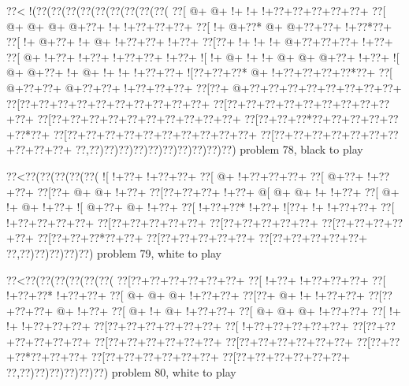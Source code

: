 \vbox{\vbox{\goo
\0??<\- !(\0??(\0??(\0??(\0??(\0??(\0??(\0??(\0??(\0??(
\0??[\- @+\- @+\- !+\- !+\- !+\0??+\0??+\0??+\0??+\0??+
\0??[\- @+\- @+\- @+\- @+\0??+\- !+\- !+\0??+\0??+\0??+
\0??[\- !+\- @+\0??*\- @+\- @+\0??+\0??+\- !+\0??*\0??+
\0??[\- !+\- @+\0??+\- !+\- @+\- !+\0??+\0??+\- !+\0??+
\0??[\0??+\- !+\- !+\- !+\- @+\0??+\0??+\0??+\- !+\0??+
\0??[\- @+\- !+\0??+\- !+\0??+\- !+\0??+\0??+\- !+\0??+
\- ![\- !+\- @+\- !+\- !+\- @+\- @+\- @+\0??+\- !+\0??+
\- ![\- @+\- @+\0??+\- !+\- @+\- !+\- !+\- !+\0??+\0??+
\- ![\0??+\0??+\0??*\- @+\- !+\0??+\0??+\0??+\0??*\0??+
\0??[\- @+\0??+\0??+\- @+\0??+\0??+\- !+\0??+\0??+\0??+
\0??[\0??+\- @+\0??+\0??+\0??+\0??+\0??+\0??+\0??+\0??+
\0??[\0??+\0??+\0??+\0??+\0??+\0??+\0??+\0??+\0??+\0??+
\0??[\0??+\0??+\0??+\0??+\0??+\0??+\0??+\0??+\0??+\0??+
\0??[\0??+\0??+\0??+\0??+\0??+\0??+\0??+\0??+\0??+\0??+
\0??[\0??+\0??+\0??*\0??+\0??+\0??+\0??+\0??+\0??*\0??+
\0??[\0??+\0??+\0??+\0??+\0??+\0??+\0??+\0??+\0??+\0??+
\0??[\0??+\0??+\0??+\0??+\0??+\0??+\0??+\0??+\0??+\0??+
\0??,\0??)\0??)\0??)\0??)\0??)\0??)\0??)\0??)\0??)\0??)
}
\hfil problem 78, black to play\hfil\break
}

\vbox{\vbox{\goo
\0??<\0??(\0??(\0??(\0??(\0??(
\- ![\- !+\0??+\- !+\0??+\0??+
\0??[\- @+\- !+\0??+\0??+\0??+
\0??[\- @+\0??+\- !+\0??+\0??+
\0??[\0??+\- @+\- @+\- !+\0??+
\0??[\0??+\0??+\0??+\- !+\0??+
\- @[\- @+\- @+\- !+\- !+\0??+
\0??[\- @+\- !+\- @+\- !+\0??+
\- ![\- @+\0??+\- @+\- !+\0??+
\0??[\- !+\0??+\0??*\- !+\0??+
\- ![\0??+\- !+\- !+\0??+\0??+
\0??[\- !+\0??+\0??+\0??+\0??+
\0??[\0??+\0??+\0??+\0??+\0??+
\0??[\0??+\0??+\0??+\0??+\0??+
\0??[\0??+\0??+\0??+\0??+\0??+
\0??[\0??+\0??+\0??*\0??+\0??+
\0??[\0??+\0??+\0??+\0??+\0??+
\0??[\0??+\0??+\0??+\0??+\0??+
\0??,\0??)\0??)\0??)\0??)\0??)
}
\hfil problem 79, white to play\hfil\break
}

\vbox{\vbox{\goo
\0??<\0??(\0??(\0??(\0??(\0??(\0??(
\0??[\0??+\0??+\0??+\0??+\0??+\0??+
\0??[\- !+\0??+\- !+\0??+\0??+\0??+
\0??[\- !+\0??+\0??*\- !+\0??+\0??+
\0??[\- @+\- @+\- @+\- !+\0??+\0??+
\0??[\0??+\- @+\- !+\- !+\0??+\0??+
\0??[\0??+\0??+\0??+\- @+\- !+\0??+
\0??[\- @+\- !+\- @+\- !+\0??+\0??+
\0??[\- @+\- @+\- @+\- !+\0??+\0??+
\0??[\- !+\- !+\- !+\0??+\0??+\0??+
\0??[\0??+\0??+\0??+\0??+\0??+\0??+
\0??[\- !+\0??+\0??+\0??+\0??+\0??+
\0??[\0??+\0??+\0??+\0??+\0??+\0??+
\0??[\0??+\0??+\0??+\0??+\0??+\0??+
\0??[\0??+\0??+\0??+\0??+\0??+\0??+
\0??[\0??+\0??+\0??*\0??+\0??+\0??+
\0??[\0??+\0??+\0??+\0??+\0??+\0??+
\0??[\0??+\0??+\0??+\0??+\0??+\0??+
\0??,\0??)\0??)\0??)\0??)\0??)\0??)
}
\hfil problem 80, white to play\hfil\break
}

